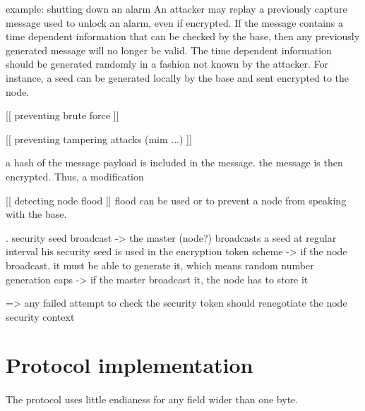\documentclass[a4paper, 11pt]{article}
\begin{document}
example: shutting down an alarm
An attacker may replay a previously capture message used to
unlock an alarm, even if encrypted. If the message contains
a time dependent information that can be checked by the base,
then any previously generated message will no longer be valid.
The time dependent information should be generated randomly
in a fashion not known by the attacker. For instance, a seed
can be generated locally by the base and sent encrypted to
the node.

[[ preventing brute force ]]

[[ preventing tampering attacks (mim ...) ]]

a hash of the message payload is included in the message. the message
is then encrypted. Thus, a modification


[[ detecting node flood ]]
flood can be used or to prevent a node from speaking with
the base.


. security seed broadcast
-> the master (node?) broadcasts a seed at regular interval his security
seed is used in the encryption token scheme
-> if the node broadcast, it must be able to generate it, which means random
number generation caps
-> if the master broadcast it, the node has to store it

=> any failed attempt to check the security token should renegotiate the
node security context











\section{Protocol implementation}
\paragraph{}
The protocol uses little endianess for any field wider than one byte.
\end{document}
